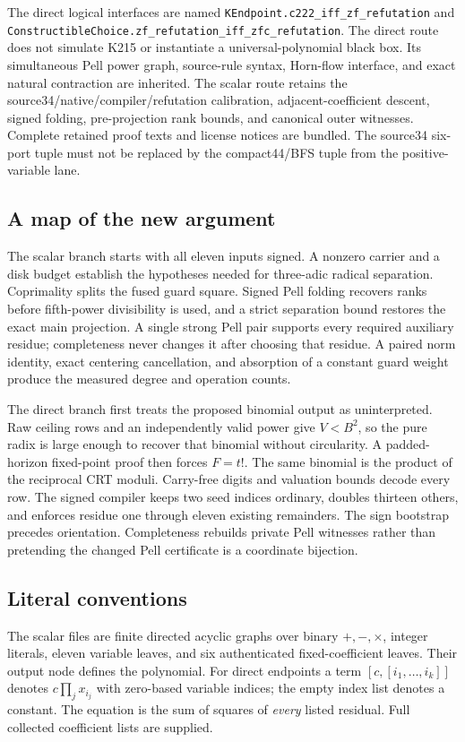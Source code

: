 The direct logical interfaces are named
\texttt{KEndpoint.c222\_iff\_zf\_refutation} and
\texttt{ConstructibleChoice.zf\_refutation\_iff\_zfc\_refutation}.
The direct route does not simulate K215 or instantiate a universal-polynomial black box. Its simultaneous Pell power graph, source-rule syntax, Horn-flow interface, and exact natural contraction are inherited. The scalar route retains the source34/native/compiler/refutation calibration, adjacent-coefficient descent, signed folding, pre-projection rank bounds, and canonical outer witnesses. Complete retained proof texts and license notices are bundled. The source34 six-port tuple must not be replaced by the compact44/BFS tuple from the positive-variable lane.

\subsection{A map of the new argument}
The scalar branch starts with all eleven inputs signed. A nonzero carrier and a disk budget establish the hypotheses needed for three-adic radical separation. Coprimality splits the fused guard square. Signed Pell folding recovers ranks before fifth-power divisibility is used, and a strict separation bound restores the exact main projection. A single strong Pell pair supports every required auxiliary residue; completeness never changes it after choosing that residue. A paired norm identity, exact centering cancellation, and absorption of a constant guard weight produce the measured degree and operation counts.

The direct branch first treats the proposed binomial output as uninterpreted. Raw ceiling rows and an independently valid power give $V<B^2$, so the pure radix is large enough to recover that binomial without circularity. A padded-horizon fixed-point proof then forces $F=t!$. The same binomial is the product of the reciprocal CRT moduli. Carry-free digits and valuation bounds decode every row. The signed compiler keeps two seed indices ordinary, doubles thirteen others, and enforces residue one through eleven existing remainders. The sign bootstrap precedes orientation. Completeness rebuilds private Pell witnesses rather than pretending the changed Pell certificate is a coordinate bijection.

\subsection{Literal conventions}
The scalar files are finite directed acyclic graphs over binary $+,-,\times$, integer literals, eleven variable leaves, and six authenticated fixed-coefficient leaves. Their output node defines the polynomial. For direct endpoints a term $[c,[i_1,\ldots,i_k]]$ denotes $c\prod_j x_{i_j}$ with zero-based variable indices; the empty index list denotes a constant. The equation is the sum of squares of \emph{every} listed residual. Full collected coefficient lists are supplied.

